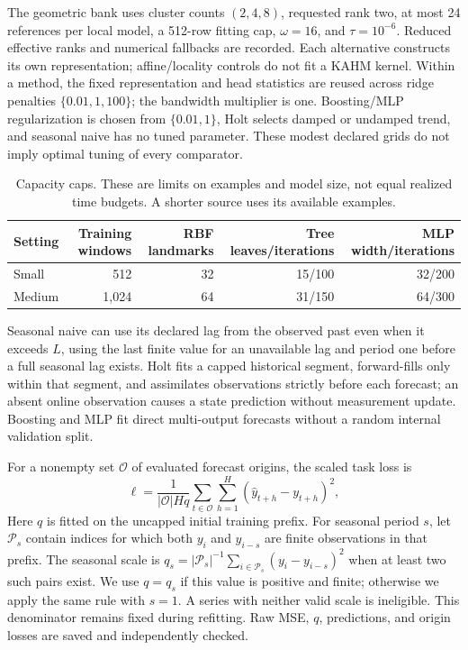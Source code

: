 The geometric bank uses cluster counts $(2,4,8)$, requested rank two, at most
24 references per local model, a 512-row fitting cap, $\omega=16$, and
$\tau=10^{-6}$.  Reduced effective ranks and numerical fallbacks are recorded.
Each alternative constructs its own representation; affine/locality controls
do not fit a KAHM kernel.  Within a method, the fixed representation and head
statistics are reused across ridge penalties $\{0.01,1,100\}$; the bandwidth
multiplier is one.  Boosting/MLP regularization is chosen from $\{0.01,1\}$,
Holt selects damped or undamped trend, and seasonal naive has no tuned parameter.
These modest declared grids do not imply optimal tuning of every comparator.

\begin{table}[t]
\caption{Capacity caps.  These are limits on examples and model size, not equal
realized time budgets.  A shorter source uses its available examples.}
\label{tab:nf-capacity}
\centering\small
\setlength{\tabcolsep}{5pt}
\begin{tabular}{@{}lrrrr@{}}
\toprule
Setting & Training windows & RBF landmarks & Tree leaves/iterations & MLP width/iterations \\
\midrule
Small & 512 & 32 & 15/100 & 32/200 \\
Medium & 1,024 & 64 & 31/150 & 64/300 \\
\bottomrule
\end{tabular}
\end{table}

Seasonal naive can use its declared lag from the observed past even when it
exceeds $L$, using the last finite value for an unavailable lag and period one
before a full seasonal lag exists.  Holt fits a capped historical segment,
forward-fills only within that segment, and assimilates observations strictly
before each forecast; an absent online observation causes a state prediction
without measurement update.  Boosting and MLP fit direct multi-output forecasts
without a random internal validation split.

For a nonempty set $\mathcal O$ of evaluated forecast origins, the
scaled task loss is
\begin{equation}
 \ell=\frac{1}{|\mathcal O|Hq}
       \sum_{t\in\mathcal O}\sum_{h=1}^{H}
       (\widehat y_{t+h}-y_{t+h})^2,
 \label{eq:nf-scaled-loss}
\end{equation}
Here $q$ is fitted on the uncapped initial training prefix. For seasonal
period $s$, let $\mathcal P_s$ contain indices for which both $y_i$ and
$y_{i-s}$ are finite observations in that prefix. The seasonal scale is
$q_s=|\mathcal P_s|^{-1}\sum_{i\in\mathcal P_s}(y_i-y_{i-s})^2$
when at least two such pairs exist. We use $q=q_s$ if this value is
positive and finite; otherwise we apply the same rule with $s=1$. A
series with neither valid scale is ineligible.  This denominator remains fixed during refitting.  Raw MSE,
$q$, predictions, and origin losses are saved and independently checked.

